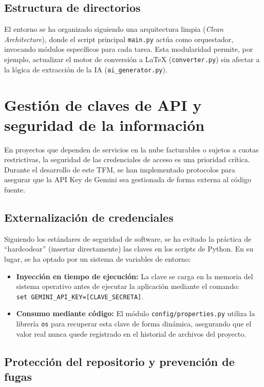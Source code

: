\subsection{Estructura de directorios}

El entorno se ha organizado siguiendo una arquitectura limpia (\textit{Clean Architecture}), donde el script principal \texttt{main.py} actúa como orquestador, invocando módulos específicos para cada tarea. Esta modularidad permite, por ejemplo, actualizar el motor de conversión a \LaTeX{} (\texttt{converter.py}) sin afectar a la lógica de extracción de la IA (\texttt{ai\_generator.py}).


\section{Gestión de claves de API y seguridad de la información}

En proyectos que dependen de servicios en la nube facturables o sujetos a cuotas restrictivas, la seguridad de las credenciales de acceso es una prioridad crítica. Durante el desarrollo de este TFM, se han implementado protocolos para asegurar que la API Key de Gemini sea gestionada de forma externa al código fuente.

\subsection{Externalización de credenciales}

Siguiendo los estándares de seguridad de software, se ha evitado la práctica de ``hardcodear'' (insertar directamente) las claves en los scripts de Python. En su lugar, se ha optado por un sistema de variables de entorno:

\begin{itemize}
    \item \textbf{Inyección en tiempo de ejecución:} La clave se carga en la memoria del sistema operativo antes de ejecutar la aplicación mediante el comando: \\ \texttt{set GEMINI\_API\_KEY=[CLAVE\_SECRETA]}.
    
    \item \textbf{Consumo mediante código:} El módulo \texttt{config/properties.py} utiliza la librería \texttt{os} para recuperar esta clave de forma dinámica, asegurando que el valor real nunca quede registrado en el historial de archivos del proyecto.
\end{itemize}

\subsection{Protección del repositorio y prevención de fugas}

